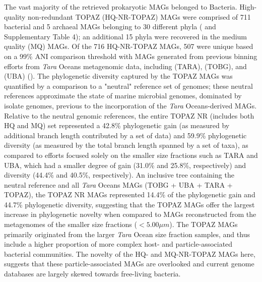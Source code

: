 \documentclass[12pt]{article}
\numberwithin{equation}{section}
\begin{document}
The vast majority of the retrieved prokaryotic MAGs belonged to Bacteria. High-quality non-redundant TOPAZ (HQ-NR-TOPAZ) MAGs were comprised of 711 bacterial and 5 archaeal MAGs belonging to 30 different phyla ( and Supplementary Table 4); an additional 15 phyla were recovered in the medium quality (MQ) MAGs. Of the 716 HQ-NR-TOPAZ MAGs, 507 were unique based on a 99\% ANI comparison threshold with MAGs generated from previous binning efforts from \textit{Tara} Oceans metagenomic data, including \citet{Delmont2018Nitrogen-fixing} (TARA), \citet{Tully2018reconstruction} (TOBG), and \citet{Parks2017Recovery} (UBA) (). The phylogenetic diversity captured by the TOPAZ MAGs was quantified by a comparison to a "neutral" reference set of genomes; these neutral references approximate the state of marine microbial genomes, dominated by isolate genomes, previous to the incorporation of the \textit{Tara} Oceans-derived MAGs. Relative to the neutral genomic references, the entire TOPAZ NR (includes both HQ and MQ) set represented a 42.8\% phylogenetic gain (as measured by additional branch length contributed by a set of data) and 59.9\% phylogenetic diversity (as measured by the total branch length spanned by a set of taxa), as compared to efforts focused solely on the smaller size fractions such as TARA and UBA, which had a smaller degree of gain (31.0\% and 25.8\%, respectively) and diversity (44.4\% and 40.5\%, respectively). An inclusive tree containing the neutral reference and all \textit{Tara} Oceans MAGs (TOBG + UBA + TARA + TOPAZ), the TOPAZ NR MAGs represented 14.4\% of the phylogenetic gain and 44.7\% phylogenetic diversity, suggesting that the TOPAZ MAGs offer the largest increase in phylogenetic novelty when compared to MAGs reconstructed from the metagenomes of the smaller size fractions ($<5.00 \mu m$). The TOPAZ MAGs primarily originated from the larger \textit{Tara} Ocean size fraction samples, and thus include a higher proportion of more complex host- and particle-associated bacterial communities. The novelty of the HQ- and MQ-NR-TOPAZ MAGs here, suggests that these particle-associated MAGs are overlooked and current genome databases are largely skewed towards free-living bacteria.

\end{document}
